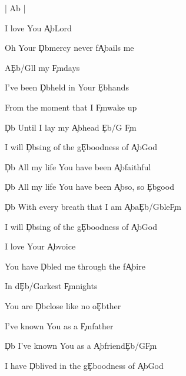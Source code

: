 \documentclass[9pt]{extarticle}
\begin{document}
\bsong

\bi[2]
| Ab |
\ei

\bv
I love You \c{Ab}Lord

Oh Your \c{Db}mercy never f\c{Ab}ails me

A\c{Eb/G}ll my \c{Fm}days

I've been \c{Db}held in Your \c{Eb}hands

From the moment that I \c{Fm}wake up

\c{Db} Until I lay my \c{Ab}head \c{Eb/G} \c{Fm}

I will \c{Db}sing of the g\c{Eb}oodness of \c{Ab}God
\ev

\bc
\c{Db} All my life You have been \c{Ab}faithful

\c{Db} All my life You have been \c{Ab}so, so \c{Eb}good

\c{Db} With every breath that I am \c{Ab}a\c{Eb/G}ble\c{Fm}

I will \c{Db}sing of the g\c{Eb}oodness of \c{Ab}God
\ec

\bv
I love Your \c{Ab}voice

You have \c{Db}led me through the f\c{Ab}ire

In d\c{Eb/G}arkest \c{Fm}nights

You are \c{Db}close like no o\c{Eb}ther

I've known You as a \c{Fm}father

\c{Db} I've known You as a \c{Ab}friend\c{Eb/G}\c{Fm}

I have \c{Db}lived in the g\c{Eb}oodness of \c{Ab}God
\ev


\bb[2]



\eb


\esong
\end{document}
